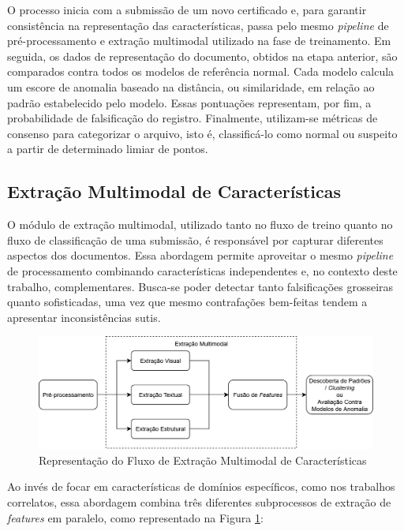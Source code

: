 O processo inicia com a submissão de um novo certificado e, para garantir consistência na representação das características, passa pelo mesmo \textit{pipeline} de pré-processamento e extração multimodal utilizado na fase de treinamento. Em seguida, os dados de representação do documento, obtidos na etapa anterior, são comparados contra todos os modelos de referência normal. Cada modelo calcula um escore de anomalia baseado na distância, ou similaridade, em relação ao padrão estabelecido pelo modelo. Essas pontuações representam, por fim, a probabilidade de falsificação do registro. Finalmente, utilizam-se métricas de consenso para categorizar o arquivo, isto é, classificá-lo como normal ou suspeito a partir de determinado limiar de pontos.

\subsection{Extração Multimodal de Características}

O módulo de extração multimodal, utilizado tanto no fluxo de treino quanto no fluxo de classificação de uma submissão, é responsável por capturar diferentes aspectos dos documentos. Essa abordagem permite aproveitar o mesmo \textit{pipeline} de processamento combinando características independentes e, no contexto deste trabalho, complementares. Busca-se poder detectar tanto falsificações grosseiras quanto sofisticadas, uma vez que mesmo contrafações bem-feitas tendem a apresentar inconsistências sutis.

\begin{figure}[H]
	\caption{\label{fig:fluxomultimodal}Representação do Fluxo de Extração Multimodal de Características}
    \begin{center}
    \includegraphics[width=1\linewidth]{images/FluxoExtracao.png}
	\end{center}
\end{figure}

Ao invés de focar em características de domínios específicos, como nos trabalhos correlatos, essa abordagem combina três diferentes subprocessos de extração de \textit{features} em paralelo, como representado na Figura \ref{fig:fluxomultimodal}:

